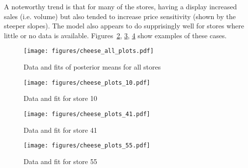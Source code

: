 \documentclass[11pt]{article}
\begin{document}
    A noteworthy trend is that for many of the stores, having a display increased sales (i.e. volume) but also tended to increase price sensitivity (shown by the steeper slopes). The model also appears to do supprisingly well for stores where little or no data is available. Figures~\ref{fig:cheese_10}, \ref{fig:cheese_41}, \ref{fig:cheese_55} show examples of these cases.

    \begin{figure}[ht] 
      \centering 
      \texttt{[image: figures/cheese\_all\_plots.pdf]}
      \vskip-10pt
      \caption{\label{fig:all_cheese}Data and fits of posterior means for all stores}
    \end{figure}

    \begin{figure}[ht] 
      \centering 
      \texttt{[image: figures/cheese\_plots\_10.pdf]}
      \vskip-10pt
      \caption{\label{fig:cheese_10} Data and fit for store 10}
    \end{figure}

    \begin{figure}[ht] 
      \centering 
      \texttt{[image: figures/cheese\_plots\_41.pdf]}
      \vskip-10pt
      \caption{\label{fig:cheese_41} Data and fit for store 41}
    \end{figure}

    \begin{figure}[ht] 
      \centering 
      \texttt{[image: figures/cheese\_plots\_55.pdf]}
      \vskip-10pt
      \caption{\label{fig:cheese_55} Data and fit for store 55}
    \end{figure}

    \clearpage

    \appendix
\end{document}
